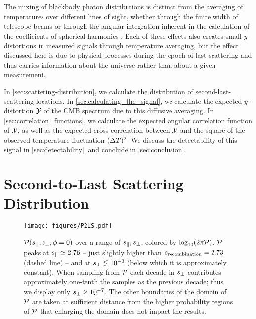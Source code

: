 \documentclass[fleqn,usenatbib]{mnras}
\begin{document}
    The mixing of blackbody photon distributions is distinct from the averaging
    of temperatures over different lines of sight, whether through the finite
    width of telescope beams \cite[e.g.][]{ChlubaSunyaev2004} or through the
    angular integration inherent in the calculation of the coefficients of
    spherical harmonics \cite[e.g.][]{Lucca+2020}.  Each of these effects also
    creates small $y$-distortions in measured signals through temperature
    averaging, but the effect discussed here is due to physical processes during
    the epoch of last scattering and thus carries information about the universe
    rather than about a given measurement.

    In \autoref{sec:scattering-distribution}, we calculate the distribution of
    second-last-scattering locations.  In \autoref{sec:calculating_the_signal},
    we calculate the expected $y$-distortion $\mathcal{Y}$ of the CMB spectrum due to
    this diffusive averaging.  In \autoref{sec:correlation_functions}, we
    calculate the expected angular correlation function of $\mathcal{Y}$, as well as the
    expected cross-correlation between $\mathcal{Y}$ and the square of the observed
    temperature fluctuation $({\Delta T})^2$.  We discuss the detectability of this
    signal in \autoref{sec:detectability}, and conclude in
    \autoref{sec:conclusion}.



\section{Second-to-Last Scattering Distribution}
\label{sec:scattering-distribution}

    \begin{figure}
        \centering
        \texttt{[image: figures/P2LS.pdf]}
        \vspace{-20pt}
        \caption{%
            $\mathcal{P}(s_{||}, s_{\perp}, \phi=0)$ over a range of $s_{||}, s_{\perp}$,
            colored by $\log_{10}\!\left(2\pi\mathcal{P}\right)$.  $\mathcal{P}$ peaks
            at $s_{||}\simeq 2.76$ -- just slightly higher than $s_{\rm recombination}=2.73$
            (dashed line) -- and at $s_{\perp} \lesssim 10^{-3}$ (below which it is
            approximately constant).  When sampling from $\mathcal{P}$ each decade
            in $s_{\perp}$ contributes approximately one-tenth the samples as the
            previous decade; thus we display only  $s_{\perp} \geq 10^{-7}$.  The
            other boundaries of the domain of $\mathcal{P}$ are taken at sufficient
            distance from the higher probability regions of $\mathcal{P}$ that
            enlarging the domain does not impact the results.%
        }
        \label{fig:P2LS}
    \end{figure}
\end{document}
